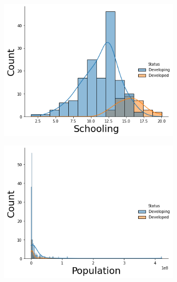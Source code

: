 \begin{itemize}
          \begin{figure}[H]
            \centering
              \begin{subfigure}{0.3\linewidth}
                \centering
                \includegraphics[width=\textwidth]{img/39.png}
              \end{subfigure}
              \hfill
                \begin{subfigure}{0.3\linewidth}
                \centering
                \includegraphics[width=\textwidth]{img/40.png}
              \end{subfigure}
              \hfill
                \begin{subfigure}{0.3\linewidth}

\end{subfigure}
\end{figure}
\end{itemize}
